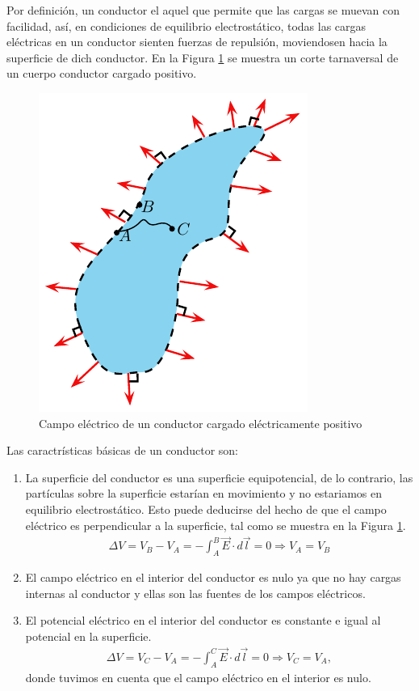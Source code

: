 Por definición, un conductor el aquel que permite que las cargas se muevan con facilidad, así, en condiciones de equilibrio electrostático, todas las cargas eléctricas en un conductor sienten fuerzas de repulsión, moviendosen hacia la superficie de dich conductor. En la Figura \ref{figconductor1} se muestra un corte tarnaversal de un cuerpo conductor cargado positivo.  

\begin{figure}
\begin{center}
\includegraphics[scale=0.8]{electrostatica/conductor1}
\end{center}
\caption{Campo eléctrico de un conductor cargado eléctricamente positivo}
\label{figconductor1}
\end{figure}

Las caractrísticas básicas de un conductor son:

\begin{enumerate}
\item La superficie del conductor es una superficie equipotencial, de lo contrario, las partículas sobre la superficie estarían en movimiento y no estariamos en equilibrio electrostático. Esto puede deducirse del hecho de que el campo eléctrico es perpendicular a la superficie, tal como se muestra en la Figura \ref{figconductor1}.
\begin{eqnarray}
\Delta V=V_B-V_A=-\int_A^B \vec{E} \cdot d\vec{l} = 0 \Rightarrow V_A=V_B
\end{eqnarray}
\item El campo eléctrico en el interior del conductor es nulo ya que no hay cargas internas al conductor y ellas son las fuentes de los campos eléctricos. 
\item El potencial eléctrico en el interior del conductor es constante e igual al potencial en la superficie.
\begin{eqnarray}
\Delta V = V_C -V_A = -\int_A^C \vec{E} \cdot d\vec{l} = 0 \Rightarrow V_C=V_A ,
\end{eqnarray}
donde tuvimos en cuenta que el campo eléctrico en el interior es nulo.

\end{enumerate}

